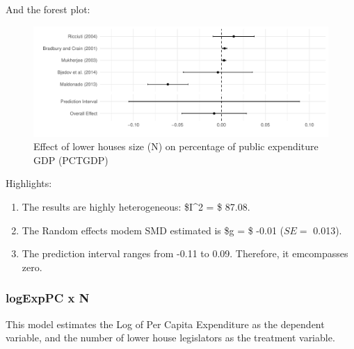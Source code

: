 \documentclass[
]{article}
\newenvironment{Shaded}{\begin{snugshade}}{\end{snugshade}}
\newcommand{\CommentTok}[1]{\textcolor[rgb]{0.56,0.35,0.01}{\textit{#1}}}
\newcommand{\DataTypeTok}[1]{\textcolor[rgb]{0.13,0.29,0.53}{#1}}
\newcommand{\KeywordTok}[1]{\textcolor[rgb]{0.13,0.29,0.53}{\textbf{#1}}}
\newcommand{\NormalTok}[1]{#1}
\newcommand{\OperatorTok}[1]{\textcolor[rgb]{0.81,0.36,0.00}{\textbf{#1}}}
\newcommand{\OtherTok}[1]{\textcolor[rgb]{0.56,0.35,0.01}{#1}}
\newcommand{\StringTok}[1]{\textcolor[rgb]{0.31,0.60,0.02}{#1}}
\providecommand{\tightlist}{%
  \setlength{\itemsep}{0pt}\setlength{\parskip}{0pt}}
\begin{document}
And the forest plot:

\begin{figure}
\centering
\includegraphics{appendixV5_files/figure-latex/unnamed-chunk-19-1.pdf}
\caption{Effect of lower houses size (N) on percentage of public
expenditure GDP (PCTGDP)}
\end{figure}

Highlights:

\begin{enumerate}
\def\labelenumi{\arabic{enumi}.}
\tightlist
\item
  The results are highly heterogeneous: \$I\^{}2 = \$ 87.08.
\item
  The Random effects modem SMD estimated is \$g = \$ -0.01 (\(SE =\)
  0.013).
\item
  The prediction interval ranges from -0.11 to 0.09. Therefore, it
  emcompasses zero.
\end{enumerate}

\newpage

\hypertarget{logexppc-x-n}{%
\subsubsection{logExpPC x N}\label{logexppc-x-n}}

This model estimates the Log of Per Capita Expenditure as the dependent
variable, and the number of lower house legislators as the treatment
variable.

\begin{Shaded}
\end{Shaded}
\end{document}
